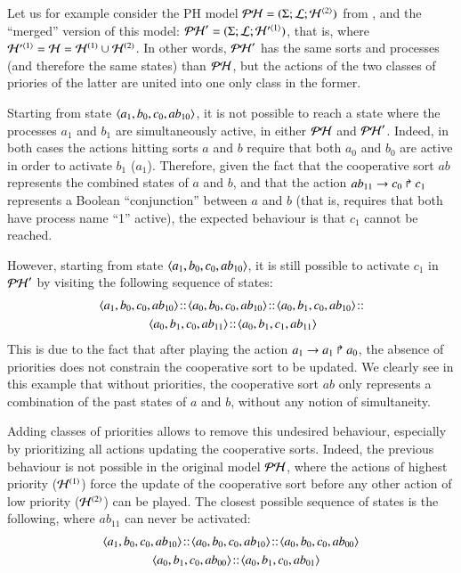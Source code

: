 Let us for example consider the PH model
$\mathcal{PH} = (\Sigma; \mathcal{L}; \mathcal{H}^{{\langle 2 \rangle}})$ from ,
and the “merged” version of this model:
$\mathcal{PH}' = (\Sigma; \mathcal{L}; \mathcal{H}'^{{\langle 1 \rangle}})$,
that is, where $\mathcal{H}'^{{\langle 1 \rangle}} = \mathcal{H} = \mathcal{H}^{(1)} \cup \mathcal{H}^{(2)}$.
In other words, $\mathcal{PH}'$ has the same sorts and processes
(and therefore the same states) than $\mathcal{PH}$,
but the actions of the two classes of priories of the latter
are united into one only class in the former.

Starting from state $\mbox{$\langle a_1, b_0, c_0, ab_{10} \rangle$}$,
it is not possible to reach a state where the processes $a_1$ and $b_1$
are simultaneously active, in either $\mathcal{PH}$ and $\mathcal{PH}'$.
Indeed, in both cases the actions hitting sorts $a$ and $b$ require that both
$a_0$ and $b_0$ are active in order to activate $b_1$ (\resp $a_1$).
Therefore, given the fact that the cooperative sort $ab$ represents
the combined states of $a$ and $b$,
and that the action $ab_{11}\rightarrow c_0\Rsh c_1$
represents a Boolean “conjunction” between $a$ and $b$
(that is, requires that both have process name “1” active),
the expected behaviour is that $c_1$ cannot be reached.

However, starting from state $\mbox{$\langle a_1, b_0, c_0, ab_{10} \rangle$}$,
it is still possible to activate $c_1$ in $\mathcal{PH}'$
by visiting the following sequence of states:
\begin{align*}
  & \PHstate{a_1, b_0, c_0, ab_{10}} \concat
    \PHstate{a_0, b_0, c_0, ab_{10}} \concat
    \PHstate{a_0, b_1, c_0, ab_{10}} \concat \\
  & \qquad\qquad
    \PHstate{a_0, b_1, c_0, ab_{11}} \concat
    \PHstate{a_0, b_1, c_1, ab_{11}}
\end{align*}
This is due to the fact that after playing the action
$a_1\rightarrow a_1\Rsh a_0$,
the absence of priorities does not constrain the cooperative sort to be updated.
We clearly see in this example that without priorities,
the cooperative sort $ab$ only represents a combination of the past
states of $a$ and $b$, without any notion of simultaneity.

Adding classes of priorities allows to remove this undesired behaviour,
especially by prioritizing all actions updating the cooperative sorts.
Indeed, the previous behaviour is not possible in the original model $\mathcal{PH}$,
where the actions of highest priority ($\mathcal{H}^{(1)}$)
force the update of the cooperative sort before any other action of
low priority ($\mathcal{H}^{(2)}$) can be played.
The closest possible sequence of states is the following,
where $ab_{11}$ can never be activated:
\begin{align*}
  & \mbox{$\langle a_1, b_0, c_0, ab_{10} \rangle$} \!::\!
    \mbox{$\langle a_0, b_0, c_0, ab_{10} \rangle$} \!::\!
    \mbox{$\langle a_0, b_0, c_0, ab_{00} \rangle$} \\
  & \qquad\qquad
    \mbox{$\langle a_0, b_1, c_0, ab_{00} \rangle$} \!::\!
    \mbox{$\langle a_0, b_1, c_0, ab_{01} \rangle$}
\end{align*}

